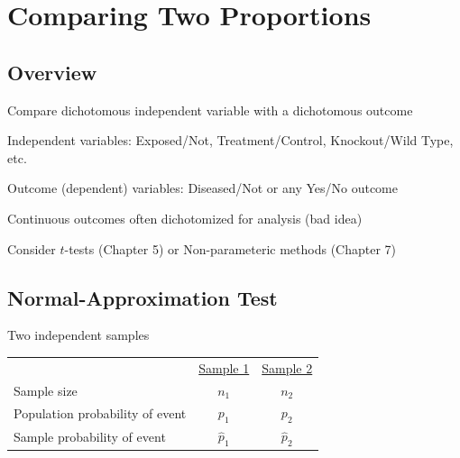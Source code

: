 
\chapter{Comparing Two Proportions} 

\section{Overview}

\bi
 \item Compare dichotomous independent variable with a dichotomous outcome
  \bi
  \item Independent variables: Exposed/Not, Treatment/Control, Knockout/Wild Type, etc.
  \item Outcome (dependent) variables: Diseased/Not or any Yes/No outcome 
  \ei
 \item Continuous outcomes often dichotomized for analysis (bad idea)
  \bi
  \item Consider $t$-tests (Chapter 5) or Non-parameteric methods (Chapter 7)
  \ei
\ei

\section{Normal-Approximation Test}
\bi
\item Two independent samples

\begin{tabular}{lcc} 
 & \underline{Sample 1} & \underline{Sample 2} \\
Sample size & $n_1$ & $n_2$ \\
Population probability of event & $p_1$ & $p_2$ \\
Sample probability of event & $\hat{p}_1$ & $\hat{p}_2$ \\
\end{tabular}

